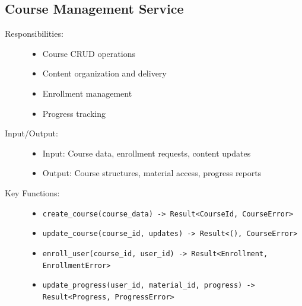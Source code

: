 \documentclass[a4paper, 11pt]{scrreprt}
\begin{document}
\subsection{Course Management Service}
\begin{description}
    \item[Responsibilities:]
    \begin{itemize}
        \item Course CRUD operations
        \item Content organization and delivery
        \item Enrollment management
        \item Progress tracking
    \end{itemize}
    
    \item[Input/Output:]
    \begin{itemize}
        \item Input: Course data, enrollment requests, content updates
        \item Output: Course structures, material access, progress reports
    \end{itemize}
    
    \item[Key Functions:]
    \begin{itemize}
        \item \texttt{create\_course(course\_data) -> Result<CourseId, CourseError>}
        \item \texttt{update\_course(course\_id, updates) -> Result<(), CourseError>}
        \item \texttt{enroll\_user(course\_id, user\_id) -> Result<Enrollment, EnrollmentError>}
        \item \texttt{update\_progress(user\_id, material\_id, progress) -> Result<Progress, ProgressError>}
    \end{itemize}
\end{description}
\end{document}
